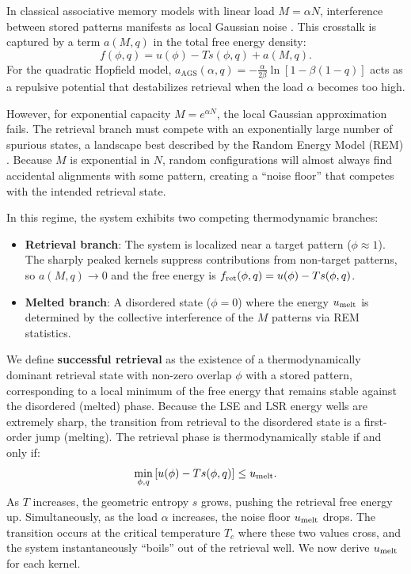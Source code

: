 \documentclass{article}
\theoremstyle{plain}
\theoremstyle{definition}
\theoremstyle{remark}
\begin{document}
In classical associative memory models with linear load $M = \alpha N$, interference between stored patterns manifests as local Gaussian noise \cite{amit1987statistical}. This crosstalk is captured by a term $a(M, q)$ in the total free energy density:
\begin{equation}
    f(\phi, q) = u(\phi) - T s(\phi, q) + a(M, q).
    \label{eq:total_free_energy}
\end{equation}
For the quadratic Hopfield model, $a_{\text{AGS}}(\alpha, q) = -\frac{\alpha}{2\beta} \ln [1 - \beta(1 - q)]$ acts as a repulsive potential that destabilizes retrieval when the load $\alpha$ becomes too high.

However, for exponential capacity $M = e^{\alpha N}$, the local Gaussian approximation fails. The retrieval branch must compete with an exponentially large number of spurious states, a landscape best described by the Random Energy Model (REM) \cite{derrida1980random}. Because $M$ is exponential in $N$, random configurations will almost always find accidental alignments with some pattern, creating a ``noise floor'' that competes with the intended retrieval state.

In this regime, the system exhibits two competing thermodynamic branches:
\begin{itemize}
    \item \textbf{Retrieval branch}: The system is localized near a target pattern ($\phi \approx 1$). The sharply peaked kernels suppress contributions from non-target patterns, so $a(M,q) \to 0$ and the free energy is $f_{\rm ret}(\phi, q) = u(\phi) - T s(\phi, q)$.
    \item \textbf{Melted branch}: A disordered state ($\phi = 0$) where the energy $u_{\rm melt}$ is determined by the collective interference of the $M$ patterns via REM statistics.
\end{itemize}

We define \textbf{successful retrieval} as the existence of a thermodynamically dominant retrieval state with non-zero overlap $\phi$ with a stored pattern, corresponding to a local minimum of the free energy that remains stable against the disordered (melted) phase.
Because the LSE and LSR energy wells are extremely sharp, the transition from retrieval to the disordered state is a first-order jump (melting). The retrieval phase is thermodynamically stable if and only if:
\begin{equation}
    \min_{\phi, q} \left[ u(\phi) - T s(\phi, q) \right] \leq u_{\rm melt}.
\end{equation}
As $T$ increases, the geometric entropy $s$ grows, pushing the retrieval free energy up. Simultaneously, as the load $\alpha$ increases, the noise floor $u_{\rm melt}$ drops. The transition occurs at the critical temperature $T_c$ where these two values cross, and the system instantaneously ``boils'' out of the retrieval well. We now derive $u_{\rm melt}$ for each kernel.
\end{document}
